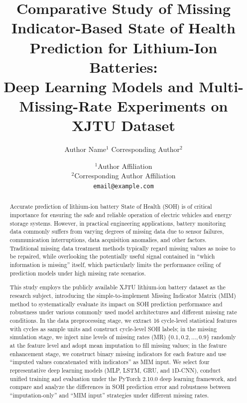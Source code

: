 \documentclass[10pt,a4paper]{article}
\title{\textbf{Comparative Study of Missing Indicator-Based State of Health Prediction for Lithium-Ion Batteries: \\Deep Learning Models and Multi-Missing-Rate Experiments on XJTU Dataset}}
\author{Author Name$^{1}$ \quad Corresponding Author$^{2}$}
\date{$^{1}$Author Affiliation \\ $^{2}$Corresponding Author Affiliation \\ \texttt{email@example.com}}
\begin{document}
\maketitle

\begin{abstract}
Accurate prediction of lithium-ion battery State of Health (SOH) is of critical importance for ensuring the safe and reliable operation of electric vehicles and energy storage systems. However, in practical engineering applications, battery monitoring data commonly suffers from varying degrees of missing data due to sensor failures, communication interruptions, data acquisition anomalies, and other factors. Traditional missing data treatment methods typically regard missing values as noise to be repaired, while overlooking the potentially useful signal contained in ``which information is missing'' itself, which particularly limits the performance ceiling of prediction models under high missing rate scenarios.

This study employs the publicly available XJTU lithium-ion battery dataset as the research subject, introducing the simple-to-implement Missing Indicator Matrix (MIM) method to systematically evaluate its impact on SOH prediction performance and robustness under various commonly used model architectures and different missing rate conditions. In the data preprocessing stage, we extract 16 cycle-level statistical features with cycles as sample units and construct cycle-level SOH labels; in the missing simulation stage, we inject nine levels of missing rates (MR) $\{0.1, 0.2, \ldots, 0.9\}$ randomly at the feature level and adopt mean imputation to fill missing values; in the feature enhancement stage, we construct binary missing indicators for each feature and use ``imputed values concatenated with indicators'' as MIM input. We select four representative deep learning models (MLP, LSTM, GRU, and 1D-CNN), conduct unified training and evaluation under the PyTorch 2.10.0 deep learning framework, and compare and analyze the differences in SOH prediction error and robustness between ``imputation-only'' and ``MIM input'' strategies under different missing rates.


\end{abstract}
\end{document}

